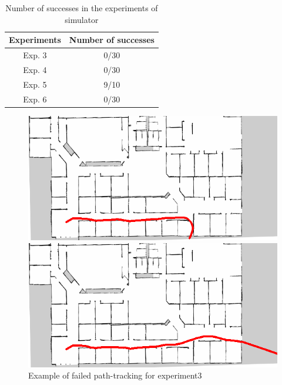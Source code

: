 \newpage
\begin{table}[h]
  \centering
  \caption{Number of successes in the experiments of simulator}
  \begin{tabular}{|c|c|} \hline
      Experiments & Number of successes \\ \hline
      Exp. 3 & 0/30 \\ \hline
      Exp. 4 & 0/30 \\ \hline
      Exp. 5 & 9/10 \\ \hline
      Exp. 6 & 0/30 \\ \hline
    \end{tabular}
  \label{tb:inves}
\end{table}

\begin{figure}[h]
  \begin{minipage}[b]{0.45\linewidth}
    \centering
    \includegraphics[keepaspectratio, scale=0.33]{images/exp3/traject30.png}
    \subcaption{}
  \end{minipage}
  \begin{minipage}[b]{0.45\linewidth}
    \centering
    \includegraphics[keepaspectratio, scale=0.33]{images/exp3/traject25.png}
    \subcaption{}
  \end{minipage}
\caption{Example of failed path-tracking for experiment3}
\label{Fig:fail3}
\end{figure}


